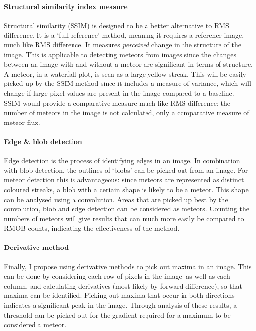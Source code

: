 \paragraph{Structural similarity index measure\\}
Structural similarity (SSIM) \cite{ssim} is designed to be a better alternative to RMS difference. It is a `full reference' method, meaning it requires a reference image, much like RMS difference. It measures {\it perceived} change in the structure of the image. This is applicable to detecting meteors from images since the changes between an image with and without a meteor are significant in terms of structure. A meteor, in a waterfall plot, is seen as a large yellow streak. This will be easily picked up by the SSIM method since it includes a measure of variance, which will change if large pixel values are present in the image compared to a baseline. SSIM would provide a comparative measure much like RMS difference: the number of meteors in the image is not calculated, only a comparative measure of meteor flux.
\paragraph{Edge \& blob detection\\}
Edge detection is the process of identifying edges in an image. In combination with blob detection, the outlines of `blobs' can be picked out from an image. For meteor detection this is advantageous: since meteors are represented as distinct coloured streaks, a blob with a certain shape is likely to be a meteor. This shape can be analysed using a convolution. Areas that are picked up best by the convolution, blob and edge detection can be considered as meteors. Counting the numbers of meteors will give results that can much more easily be compared to RMOB counts, indicating the effectiveness of the method.
\paragraph{Derivative method\\}
Finally, I propose using derivative methods to pick out maxima in an image. This can be done by considering each row of pixels in the image, as well as each column, and calculating derivatives (most likely by forward difference), so that maxima can be identified. Picking out maxima that occur in both directions indicates a significant peak in the image. Through analysis of these results, a threshold can be picked out for the gradient required for a maximum to be considered a meteor.
